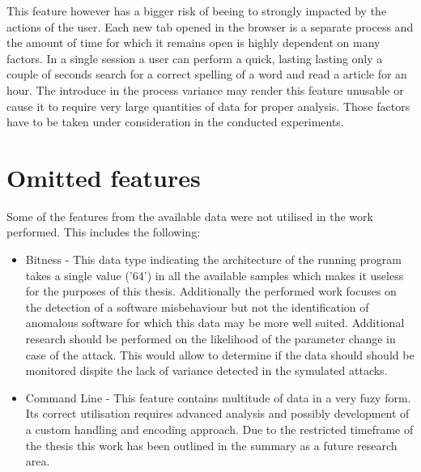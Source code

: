 \documentclass[a4paper,twoside,12pt]{book}
\begin{document}
This feature however has a bigger risk of beeing to strongly impacted by the actions of the user. 
Each new tab opened in the browser is a separate process and the amount of time for which it remains
open is highly dependent on many factors. In a single session a user can perform a quick, lasting 
lasting only a couple of seconds search for a correct spelling of a word and read a article for 
an hour. The introduce in the process variance may render this feature unusable or cause it to
require very large quantities of data for proper analysis. Those factors have to be taken 
under consideration in the conducted experiments.


\section{Omitted features}


Some of the features from the available data were not utilised in the work performed. This includes
the following:
\begin{itemize}
	\item Bitness - This data type indicating the architecture of the running program takes a single value ('64')
	in all the available samples which makes it useless for the purposes of this thesis. Additionally the performed
	work focuses on the detection of a software misbehaviour but not the identification of anomalous software 
	for which this data may be more well suited. Additional research should be performed on the likelihood of the
	parameter change in case of the attack. This would allow to determine if the data should should be monitored dispite
	the lack of variance detected in the symulated attacks.
	\item Command Line -  This feature contains multitude of data in a very fuzy form. Its correct utilisation
	requires advanced analysis and possibly development of a custom handling and encoding approach. Due 
	to the restricted timeframe of the thesis this work has been outlined in the summary as a future research
	area.
\end{itemize}
\end{document}
